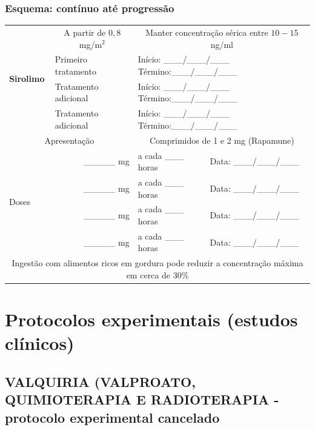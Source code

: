 \documentclass[11pt,a4paper,oldfontcommands]{memoir}
\begin{document}
\subsection{Esquema: contínuo até progressão}
\begin{center}
\begin{table}[H]
	\begin{tabular}{p{2.0cm}|p{4.0cm}|p{5.0cm}p{3.5cm}}
    \hline
		\multirow{4}{*}{\textbf{Sirolimo}}&\multicolumn{1}{c|}{A partir de \(0,8\) mg/m\(^2\)}&\multicolumn{2}{c}{Manter concentração sérica entre \(10-15\) ng/ml}\\
		{}&{Primeiro tratamento}&\multicolumn{2}{l}{Início: \_\_\_/\_\_\_/\_\_\_ Término:\_\_\_/\_\_\_/\_\_\_}\\
		{}&{Tratamento adicional}&\multicolumn{2}{l}{Início: \_\_\_/\_\_\_/\_\_\_ Término:\_\_\_/\_\_\_/\_\_\_}\\
		{}&{Tratamento adicional}&\multicolumn{2}{l}{Início: \_\_\_/\_\_\_/\_\_\_ Término:\_\_\_/\_\_\_/\_\_\_}\\
    \hline
		\multicolumn{2}{c|}{Apresentação}&\multicolumn{2}{c}{Comprimidos de 1 e 2 mg (Rapamune)}\\
    \hline
		\multirow{4}{*}{Doses}&\multicolumn{1}{r}{\_\_\_\_\_ mg}&{a cada \_\_\_ horas}&{Data: \_\_\_/\_\_\_/\_\_\_}\\
		{}&\multicolumn{1}{r}{\_\_\_\_\_ mg}&{a cada \_\_\_ horas}&{Data: \_\_\_/\_\_\_/\_\_\_}\\
		{}&\multicolumn{1}{r}{\_\_\_\_\_ mg}&{a cada \_\_\_ horas}&{Data: \_\_\_/\_\_\_/\_\_\_}\\
		{}&\multicolumn{1}{r}{\_\_\_\_\_ mg}&{a cada \_\_\_ horas}&{Data: \_\_\_/\_\_\_/\_\_\_}\\
    \hline
    \multicolumn{4}{c}{Ingestão com alimentos ricos em gordura  pode reduzir a concentração máxima em cerca de 30\%}\\
    \hline
\end{tabular}
\end{table}
\end{center}

\cleardoublepage
\chapter{Protocolos experimentais (estudos clínicos)}
\cleardoublepage

\section{VALQUIRIA (VALPROATO, QUIMIOTERAPIA E RADIOTERAPIA - protocolo experimental cancelado}
{\let\thefootnote\relax{}}
\end{document}
